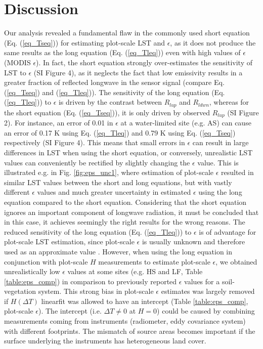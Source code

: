 \documentclass[fleqn,10pt]{wlscirep}
\begin{document}
\section{Discussion}
Our analysis revealed a fundamental flaw in the commonly used short equation (Eq. (\ref{eq_Tseq})) for estimating plot-scale LST and $\epsilon$, as it does not produce the same results as the long equation (Eq. (\ref{eq_Tleq})) even with high values of $\epsilon$ (MODIS $\epsilon$). In fact, the short equation strongly over-estimates the sensitivity of LST to $\epsilon$ (SI Figure 4), as it neglects the fact that low emissivity results in a greater fraction of reflected longwave in the sensor signal (compare Eq. (\ref{eq_Tseq}) and (\ref{eq_Tleq})). The sensitivity of the long equation (Eq. (\ref{eq_Tleq})) to $\epsilon$ is driven by the contrast between $R_{lup}$ and $R_{ldwn}$, whereas for the short equation (Eq. (\ref{eq_Tseq})), it is only driven by observed $R_{lup}$ (SI Figure 2). For instance, an error of 0.01 in $\epsilon$ at a water-limited site (e.g. AS) can cause an error of 0.17 K using Eq. (\ref{eq_Tleq}) and 0.79 K using Eq. (\ref{eq_Tseq}) respectively (SI Figure 4). This means that small errors in $\epsilon$ can result in large differences in LST when using the short equation, or conversely, unrealistic LST values can conveniently be rectified by slightly changing the $\epsilon$ value. This is illustrated e.g. in Fig. \ref{fig:eps_unc1}, where estimation of plot-scale $\epsilon$ resulted in similar LST values between the short and long equations, but with vastly different $\epsilon$ values and much greater uncertainty in estimated $\epsilon$ using the long equation compared to the short equation. Considering that the short equation ignores an important component of longwave radiation, it must be concluded that in this case, it achieves seemingly the right results for the wrong reasons. The reduced sensitivity of the long equation (Eq. (\ref{eq_Tleq})) to $\epsilon$ is of advantage for plot-scale LST estimation, since plot-scale $\epsilon$ is usually unknown and therefore used as an approximate value \cite{mallick2018bridging}. However, when using the long equation in conjunction with plot-scale $H$ measurements to estimate plot-scale $\epsilon$, we obtained unrealistically low $\epsilon$ values at some sites (e.g. HS and LF, Table \ref{table:eps_comp}) in comparison to previously reported  $\epsilon$ values for a soil-vegetation system\cite{sugita1996optimal,snyder1998classification}. This strong bias in plot-scale $\epsilon$ estimates was largely removed if  $H(\Delta T)$ linearfit was allowed to have an intercept (Table \ref{table:eps_comp}, plot-scale $\epsilon$). The intercept (i.e. $\Delta T \ne 0$ at $H=0$) could be caused by combining measurements coming from instruments (radiometer, eddy covariance system) with different footprints\cite{marcolla2018geometry}. The mismatch of source areas becomes important if the surface underlying the instruments has heterogeneous land cover. 
\end{document}
